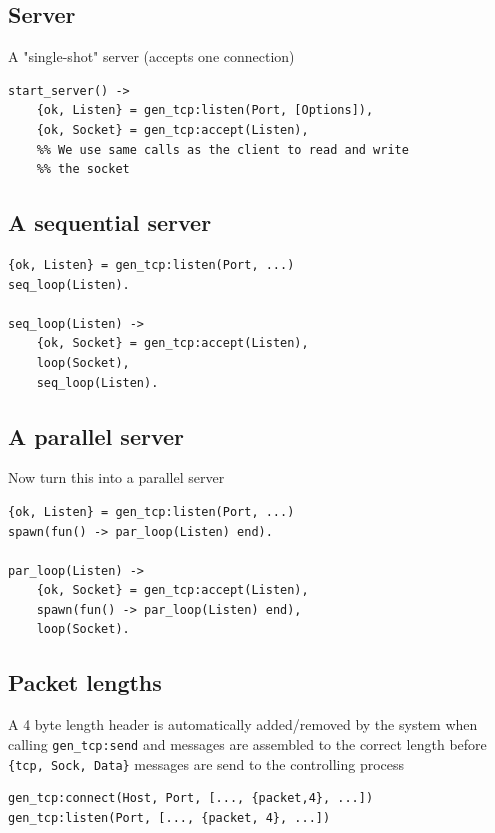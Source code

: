 \documentclass[12pt]{article}
\begin{document}
\subsection{Server}

A "single-shot" server (accepts one connection)

\begin{verbatim}
start_server() ->
    {ok, Listen} = gen_tcp:listen(Port, [Options]),
    {ok, Socket} = gen_tcp:accept(Listen),
    %% We use same calls as the client to read and write
    %% the socket
\end{verbatim}

\subsection{A sequential server}

\begin{verbatim}
{ok, Listen} = gen_tcp:listen(Port, ...)
seq_loop(Listen).

seq_loop(Listen) ->
    {ok, Socket} = gen_tcp:accept(Listen),
    loop(Socket),
    seq_loop(Listen).
\end{verbatim}

\subsection{A parallel server}

Now turn this into a parallel server

\begin{verbatim}
{ok, Listen} = gen_tcp:listen(Port, ...)
spawn(fun() -> par_loop(Listen) end).

par_loop(Listen) ->
    {ok, Socket} = gen_tcp:accept(Listen),
    spawn(fun() -> par_loop(Listen) end),
    loop(Socket).
\end{verbatim}

\subsection{Packet lengths}

A 4 byte length header is automatically added/removed by the system
when calling \verb+gen_tcp:send+ and messages are assembled to the
correct length before \verb+{tcp, Sock, Data}+ messages are send to
the controlling process

\begin{verbatim}
gen_tcp:connect(Host, Port, [..., {packet,4}, ...])
gen_tcp:listen(Port, [..., {packet, 4}, ...])
\end{verbatim}
\end{document}
